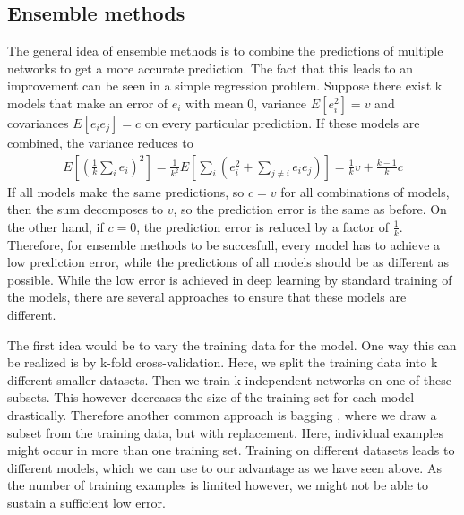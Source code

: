 \subsection{Ensemble methods}\label{sub:Ensemble_Methods}
The general idea of ensemble methods is to combine the predictions of multiple
networks to get a more accurate prediction. The fact that this leads to an
improvement can be seen in a simple regression problem. Suppose there exist k
models that make an error of $e_i$ with mean 0, variance $E[e_i^2]=v$ and
covariances $E[e_i e_j]=c$ on every particular prediction. If these models are
combined, the variance reduces to 
\begin{align}
    E[(\frac{1}{k} \sum_i e_i)^2]=\frac{1}{k^2}E[\sum_i (e_i^2 + \sum_{j\neq i} e_i e_j)]=\frac{1}{k}v+\frac{k-1}{k}c
\end{align}
If all models make the same predictions, so $c=v$ for all combinations of
models, then the sum decomposes to $v$, so the prediction error is the same as
before. On the other hand, if $c=0$, the prediction error is reduced by a factor
of $\frac{1}{k}$. Therefore, for ensemble methods to be succesfull, every model
has to achieve a low prediction error, while the predictions of all models
should be as different as possible. While the low error is achieved in deep
learning by standard training of the models, there are several approaches to
ensure that these models are different. 

The first idea would be to vary the training data for the model. One way this
can be realized is by k-fold cross-validation. Here, we split the training data
into k different smaller datasets. Then we train k independent networks on one
of these subsets. This however decreases the size of the training set for each
model drastically. Therefore another common approach is bagging
\cite{breiman1996bagging}, where we draw a subset from the training data, but
with replacement. Here, individual examples might occur in more than one
training set. Training on different datasets leads to different models, which we
can use to our advantage as we have seen above. As the number of training
examples is limited however, we might not be able to sustain a sufficient low
error.

